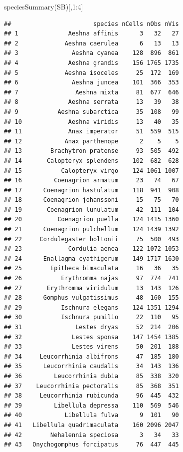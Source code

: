\documentclass[
  10pt,
]{article}
\newenvironment{Shaded}{\begin{snugshade}}{\end{snugshade}}
\newcommand{\DecValTok}[1]{\textcolor[rgb]{0.00,0.00,0.81}{#1}}
\newcommand{\FunctionTok}[1]{\textcolor[rgb]{0.00,0.00,0.00}{#1}}
\newcommand{\NormalTok}[1]{#1}
\newcommand{\SpecialCharTok}[1]{\textcolor[rgb]{0.00,0.00,0.00}{#1}}
\begin{document}
\begin{Shaded}
\begin{Highlighting}[]
\FunctionTok{speciesSummary}\NormalTok{(SB)[,}\DecValTok{1}\SpecialCharTok{:}\DecValTok{4}\NormalTok{]}
\end{Highlighting}
\end{Shaded}

\begin{verbatim}
##                       species nCells nObs nVis
## 1              Aeshna affinis      3   32   27
## 2             Aeshna caerulea      6   13   13
## 3               Aeshna cyanea    128  896  861
## 4              Aeshna grandis    156 1765 1735
## 5             Aeshna isoceles     25  172  169
## 6               Aeshna juncea    101  366  353
## 7                Aeshna mixta     81  677  646
## 8              Aeshna serrata     13   39   38
## 9           Aeshna subarctica     35  108   99
## 10             Aeshna viridis     13   40   35
## 11             Anax imperator     51  559  515
## 12            Anax parthenope      2    5    5
## 13        Brachytron pratense     93  505  492
## 14       Calopteryx splendens    102  682  628
## 15           Calopteryx virgo    124 1061 1007
## 16         Coenagrion armatum     23   74   67
## 17      Coenagrion hastulatum    118  941  908
## 18      Coenagrion johanssoni     15   75   70
## 19       Coenagrion lunulatum     42  111  104
## 20          Coenagrion puella    124 1415 1360
## 21      Coenagrion pulchellum    124 1439 1392
## 22     Cordulegaster boltonii     75  500  493
## 23             Cordulia aenea    122 1072 1053
## 24      Enallagma cyathigerum    149 1717 1630
## 25        Epitheca bimaculata     16   36   35
## 26           Erythromma najas     97  774  741
## 27       Erythromma viridulum     13  143  126
## 28      Gomphus vulgatissimus     48  160  155
## 29           Ischnura elegans    124 1351 1294
## 30           Ischnura pumilio     22  110   95
## 31               Lestes dryas     52  214  206
## 32              Lestes sponsa    147 1454 1385
## 33              Lestes virens     50  201  188
## 34     Leucorrhinia albifrons     47  185  180
## 35      Leucorrhinia caudalis     34  143  136
## 36         Leucorrhinia dubia     85  338  320
## 37    Leucorrhinia pectoralis     85  368  351
## 38     Leucorrhinia rubicunda     96  445  432
## 39         Libellula depressa    110  569  546
## 40            Libellula fulva      9  101   90
## 41   Libellula quadrimaculata    160 2096 2047
## 42        Nehalennia speciosa      3   34   33
## 43   Onychogomphus forcipatus     76  447  445

\end{verbatim}
\end{document}
